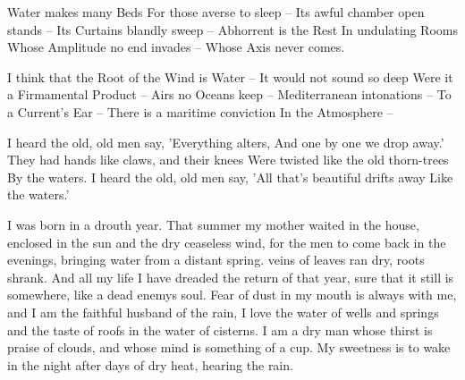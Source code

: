 \documentclass[12pt, letterpaper]{report}
\begin{document}
\begin{poem}
\begin{stanza}
Water makes many Beds\verseline
For those averse to sleep --\verseline
Its awful chamber open stands --\verseline
Its Curtains blandly sweep --\verseline
Abhorrent is the Rest\verseline
In undulating Rooms\verseline
Whose Amplitude no end invades --\verseline
Whose Axis never comes.
\end{stanza}
\end{poem}

\author{by Emily Dickinson}

\begin{poem}
\begin{stanza}
I think that the Root of the Wind is Water --\verseline
It would not sound so deep\verseline
Were it a Firmamental Product --\verseline
Airs no Oceans keep --\verseline
Mediterranean intonations --\verseline
To a Current's Ear --\verseline
There is a maritime conviction\verseline
In the Atmosphere --
\end{stanza}
\end{poem}

\clearpage

\author{William Butler Yeats}

\begin{poem}
\begin{stanza}
I heard the old, old men say,\verseline
'Everything alters,\verseline
And one by one we drop away.'\verseline
They had hands like claws, and their knees\verseline
Were twisted like the old thorn-trees\verseline
By the waters.\verseline
I heard the old, old men say,\verseline
'All that's beautiful drifts away\verseline
Like the waters.'
\end{stanza}
\end{poem}

\author{Wendell Berry}

\begin{poem}
\begin{stanza}
I was born in a drouth year. That summer\verseline
my mother waited in the house, enclosed\verseline
in the sun and the dry ceaseless wind,\verseline
for the men to come back in the evenings,\verseline
bringing water from a distant spring.\verseline
veins of leaves ran dry, roots shrank.\verseline
And all my life I have dreaded the return\verseline
of that year, sure that it still is\verseline
somewhere, like a dead enemys soul.\verseline
Fear of dust in my mouth is always with me,\verseline
and I am the faithful husband of the rain,\verseline
I love the water of wells and springs\verseline
and the taste of roofs in the water of cisterns.\verseline
I am a dry man whose thirst is praise\verseline
of clouds, and whose mind is something of a cup.\verseline
My sweetness is to wake in the night\verseline
after days of dry heat, hearing the rain.
\end{stanza}
\end{poem}
\end{document}
